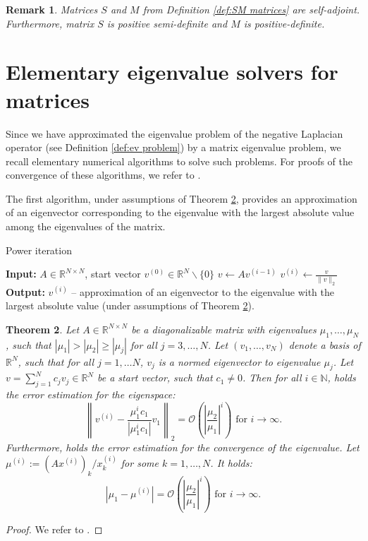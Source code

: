 \documentclass[a4paper,11pt,bibliography=totoc,listof=totoc,headinclude=true,cleardoublepage=empty,oneside]{scrbook}
\newtheorem{theorem}{Theorem}[chapter]
\newtheorem{rem}[theorem]{Remark}
\newcommand{\R}{\mathbb{R}}
\newcommand{\N}{\mathbb{N}}
\newcommand{\bigO}{\mathcal{O}}
\begin{document}
\begin{rem}
Matrices $S$ and $M$ from Definition \ref{def:SM matrices} are self-adjoint. Furthermore, matrix $S$ is positive semi-definite and $M$ is positive-definite.
\end{rem}


\section{Elementary eigenvalue solvers for matrices}
Since we have approximated the eigenvalue problem of the negative Laplacian operator (see Definition \ref{def:ev problem}) by a matrix eigenvalue problem, we recall elementary numerical algorithms to solve such problems. For proofs of the convergence of these algorithms, we refer to \cite{numericsAB}.

The first algorithm, under assumptions of Theorem \ref{theorem:power iteration}, provides an approximation of an eigenvector corresponding to the eigenvalue with the largest absolute value among the eigenvalues of the matrix.

\begin{algorithm}[H]
\caption{Power iteration}\label{alg:power iteration}
\begin{algorithmic}
    \State \textbf{Input:} $A \in \R^{N \times N}$, start vector $v^{(0)}\in \R^N \backslash\{0\}$
        \State $v \gets Av^{(i-1)} $
        \State $v^{(i)} \gets \frac{v}{\|v\|_2}$
    \EndFor
    \State \textbf{Output:} $v^{(i)}$ -- approximation of an eigenvector to the eigenvalue with the largest absolute value (under assumptions of Theorem \ref{theorem:power iteration}).
    \end{algorithmic}
\end{algorithm}
\begin{theorem}\label{theorem:power iteration}
Let $A \in \R^{N \times N}$ be a diagonalizable matrix with eigenvalues $\mu_1, \dots, \mu_N$, such that $|\mu_1| > |\mu_2| \geqslant |\mu_j|$ for all $j = 3,\dots,N$. Let $(v_1, \dots, v_N)$ denote a basis of $\R^N$, such that for all $j=1, \dots N$, $v_j$ is a normed eigenvector to eigenvalue $\mu_j$. Let $v = \sum_{j=1}^N c_j v_j \in \R^N$ be a start vector, such that $c_1 \neq 0$. Then for all $i \in \N$, holds the error estimation for the eigenspace:
\begin{equation*}
        \left\| v^{(i)} - \frac{\mu_1^i c_1}{|\mu_1^i c_1|} v_1 \right\|_2 = \bigO\left( \left|\frac{\mu_2}{\mu_1}\right|^i\right) \text{ for } i \rightarrow \infty.
\end{equation*}
Furthermore, holds the error estimation for the convergence of the eigenvalue. Let $\mu^{(i)} := (Ax^{(i)})_k / x^{(i)}_k $ for some $k = 1, \dots, N$. It holds:
    \begin{equation*}
        |\mu_1 - \mu^{(i)}| = \bigO\left( \left|\frac{\mu_2}{\mu_1}\right|^i\right) \text{ for } i \rightarrow \infty.
    \end{equation*}
\end{theorem}
\begin{proof}
We refer to \cite[p. 116]{numericsAB}.
\end{proof}
\end{document}
